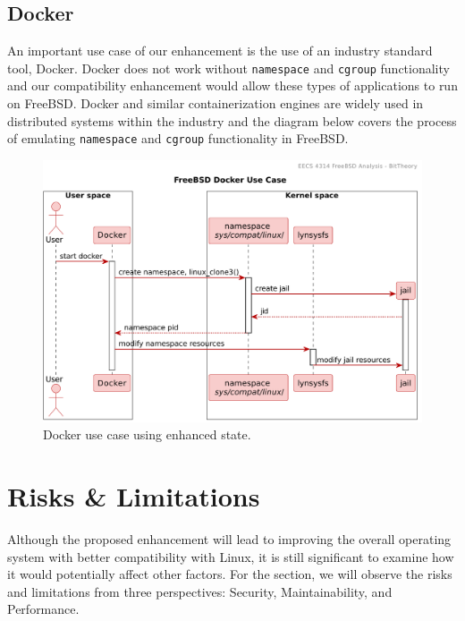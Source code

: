 \documentclass[12pt, dvipsnames, a4paper]{article}
\newcommand{\code}[1]{\texttt{#1}}
\begin{document}
\subsection{Docker}
An important use case of our enhancement is the use of an industry standard tool, Docker. Docker does not work without \code{namespace} and \code{cgroup} functionality and our compatibility enhancement would allow these types of applications to run on FreeBSD. Docker and similar containerization engines are widely used in distributed systems within the industry and the diagram below covers the process of emulating \code{namespace} and \code{cgroup} functionality in FreeBSD.
\begin{figure}[!htb]
	\center
	\includegraphics[width = 500pt]{assets/sequence_diagrams/docker.pdf}
	\caption{Docker use case using enhanced state.}
\end{figure}
\clearpage

\section{Risks \& Limitations}
Although the proposed enhancement will lead to improving the overall operating system with better compatibility with Linux, it is still significant to examine how it would potentially affect other factors. For the section, we will observe the risks and limitations from three perspectives: Security, Maintainability, and Performance.
\end{document}

